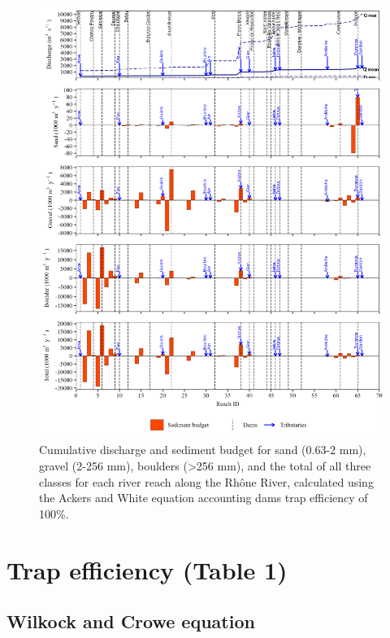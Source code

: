 \documentclass[
]{book}
\begin{document}
\begin{figure}
\includegraphics[width=26.24in]{img/res_cascade/res_E3_eA&W/plots_sed_budget-silt/sed_bud_res_sum_hy_E3_eA&W} \caption{Cumulative discharge and sediment budget for sand (0.63-2 mm), gravel (2-256 mm), boulders (>256 mm), and the total of all three classes for each river reach along the Rhône River, calculated using the Ackers and White equation accounting dams trap efficiency of 100\%.}\label{fig:budgetE3eA}
\end{figure}

\section{Trap efficiency (Table 1)}\label{trap-efficiency-table-1}

\subsection{Wilkock and Crowe equation}\label{wilkock-and-crowe-equation-2}
\end{document}
